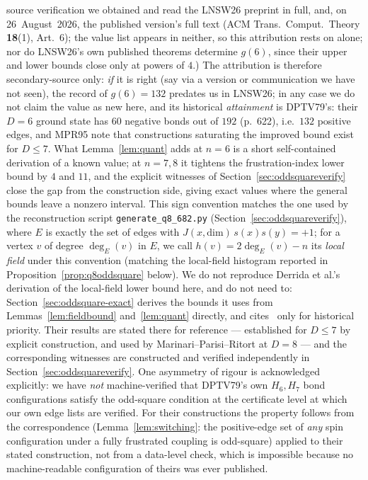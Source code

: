 \documentclass[12pt,a4paper]{article}
\theoremstyle{definition}
\begin{document}
source verification we obtained and read the LNSW26 preprint in full, and,
on 26~August~2026, the published version's full text (ACM
Trans.\ Comput.\ Theory \textbf{18}(1), Art.~6); the value list appears in
neither, so this attribution rests on \cite{Emlek26} alone; nor do
LNSW26's own published theorems determine $g(6)$, since their upper and
lower bounds close only at powers of $4$.) The attribution is therefore
secondary-source only: \emph{if} it is right (say via a version or
communication we have not seen), the record of $g(6)=132$ predates us in
LNSW26; in any case we do not claim the value as new here, and its
historical \emph{attainment} is DPTV79's: their $D=6$ ground state has $60$ negative bonds out of $192$
(p.~622), i.e.\ $132$ positive edges, and MPR95 note that constructions
saturating the improved bound exist for $D\le7$. What
Lemma~\ref{lem:quant} adds at $n=6$ is a short self-contained derivation of a
known value; at $n=7,8$ it tightens the frustration-index lower bound by $4$
and $11$, and the explicit witnesses of
Section~\ref{sec:oddsquareverify} close the gap from the construction side,
giving exact values where the general bounds leave a nonzero interval. This sign convention matches the one used by the reconstruction
script \texttt{generate\_q8\_682.py} (Section~\ref{sec:oddsquareverify}),
where $E$ is exactly the set of edges with $J(x,\mathrm{dim})\,s(x)s(y)=+1$;
for a vertex $v$ of degree $\deg_E(v)$ in $E$, we call
$h(v)=2\deg_E(v)-n$ its \emph{local field} under this convention (matching
the local-field histogram reported in Proposition~\ref{prop:q8oddsquare}
below). We do not reproduce Derrida et al.'s derivation of the local-field
lower bound here, and do not need to: Section~\ref{sec:oddsquare-exact}
derives the bounds it uses from Lemmas~\ref{lem:fieldbound}
and~\ref{lem:quant} directly, and cites~\cite{DPTV79,MPR95} only for
historical priority. Their results are stated there for reference ---
established for $D\le7$ by explicit construction, and used by
Marinari--Parisi--Ritort at $D=8$ --- and the corresponding witnesses
are constructed and verified independently in
Section~\ref{sec:oddsquareverify}. One asymmetry of rigour is acknowledged
explicitly: we have \emph{not} machine-verified that DPTV79's own $H_6,H_7$
bond configurations satisfy the odd-square condition at the certificate level
at which our own edge lists are verified. For their constructions the property
follows from the correspondence (Lemma~\ref{lem:switching}: the positive-edge
set of \emph{any} spin configuration under a fully frustrated coupling is
odd-square) applied to their stated construction, not from a data-level check,
which is impossible because no machine-readable configuration of theirs was
ever published.
\end{document}
